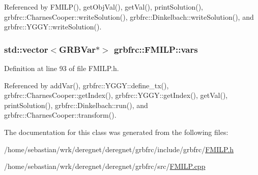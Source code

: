 Referenced by F\+M\+I\+L\+P(), get\+Obj\+Val(), get\+Val(), print\+Solution(), grbfrc\+::\+Charnes\+Cooper\+::write\+Solution(), grbfrc\+::\+Dinkelbach\+::write\+Solution(), and grbfrc\+::\+Y\+G\+G\+Y\+::write\+Solution().

\subsubsection[{\texorpdfstring{vars}{vars}}]{\setlength{\rightskip}{0pt plus 5cm}std\+::vector$<$G\+R\+B\+Var$\ast$$>$ grbfrc\+::\+F\+M\+I\+L\+P\+::vars\hspace{0.3cm}{\ttfamily [private]}}\hypertarget{classgrbfrc_1_1FMILP_acbf6866651d8b8b18c094302cf2a4284}{}\label{classgrbfrc_1_1FMILP_acbf6866651d8b8b18c094302cf2a4284}


Definition at line 93 of file F\+M\+I\+L\+P.\+h.



Referenced by add\+Var(), grbfrc\+::\+Y\+G\+G\+Y\+::define\+\_\+tx(), grbfrc\+::\+Charnes\+Cooper\+::get\+Index(), grbfrc\+::\+Y\+G\+G\+Y\+::get\+Index(), get\+Val(), print\+Solution(), grbfrc\+::\+Dinkelbach\+::run(), and grbfrc\+::\+Charnes\+Cooper\+::transform().



The documentation for this class was generated from the following files\+:\begin{DoxyCompactItemize}
\item 
/home/sebastian/wrk/deregnet/deregnet/grbfrc/include/grbfrc/\hyperlink{FMILP_8h}{F\+M\+I\+L\+P.\+h}\item 
/home/sebastian/wrk/deregnet/deregnet/grbfrc/src/\hyperlink{FMILP_8cpp}{F\+M\+I\+L\+P.\+cpp}\end{DoxyCompactItemize}
